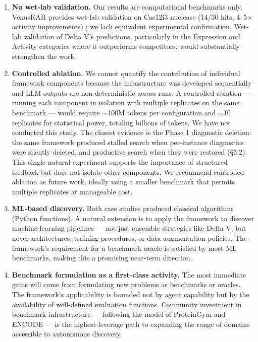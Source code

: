 \documentclass[11pt,a4paper]{article}
\begin{document}
\begin{enumerate}
    \item \textbf{No wet-lab validation.} Our results are computational benchmarks only. VenusRAR provides wet-lab validation on Cas12i3 nuclease (14/30 hits, 4--5$\times$ activity improvements) \citep{tan2026venusrar}; we lack equivalent experimental confirmation. Wet-lab validation of Delta V's predictions, particularly in the Expression and Activity categories where it outperforms competitors, would substantially strengthen the work.
    \item \textbf{Controlled ablation.} We cannot quantify the contribution of individual framework components because the infrastructure was developed sequentially and LLM outputs are non-deterministic across runs. A controlled ablation --- running each component in isolation with multiple replicates on the same benchmark --- would require $\sim$100M tokens per configuration and $\sim$10 replicates for statistical power, totaling billions of tokens. We have not conducted this study. The closest evidence is the Phase 1 diagnostic deletion: the same framework produced stalled search when per-instance diagnostics were silently deleted, and productive search when they were restored (\S5.2). This single natural experiment supports the importance of structured feedback but does not isolate other components. We recommend controlled ablation as future work, ideally using a smaller benchmark that permits multiple replicates at manageable cost.
    
    \item \textbf{ML-based discovery.} Both case studies produced classical algorithms (Python functions). A natural extension is to apply the framework to discover machine-learning pipelines --- not just ensemble strategies like Delta V, but novel architectures, training procedures, or data augmentation policies. The framework's requirement for a benchmark oracle is satisfied by most ML benchmarks, making this a promising near-term direction.
    
    \item \textbf{Benchmark formulation as a first-class activity.} The most immediate gains will come from formulating new problems as benchmarks or oracles. The framework's applicability is bounded not by agent capability but by the availability of well-defined evaluation functions. Community investment in benchmark infrastructure --- following the model of ProteinGym and ENCODE --- is the highest-leverage path to expanding the range of domains accessible to autonomous discovery.
\end{enumerate}
\end{document}
